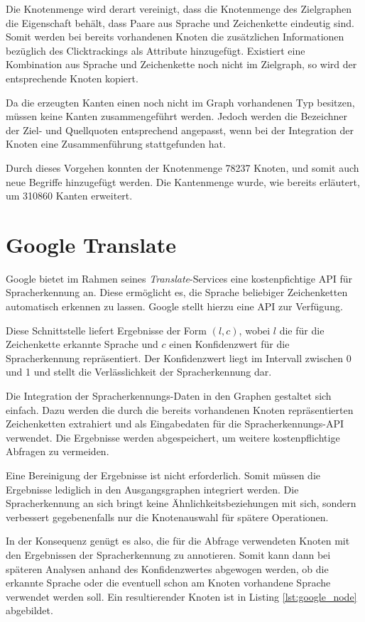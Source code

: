 Die Knotenmenge wird derart vereinigt, dass die Knotenmenge des Zielgraphen die Eigenschaft behält, dass Paare aus Sprache und Zeichenkette eindeutig sind. Somit werden bei bereits vorhandenen Knoten die zusätzlichen Informationen bezüglich des Clicktrackings als Attribute hinzugefügt. Existiert eine Kombination aus Sprache und Zeichenkette noch nicht im Zielgraph, so wird der entsprechende Knoten kopiert.

Da die erzeugten Kanten einen noch nicht im Graph vorhandenen Typ besitzen, müssen keine Kanten zusammengeführt werden. Jedoch werden die Bezeichner der Ziel- und Quellquoten entsprechend angepasst, wenn bei der Integration der Knoten eine Zusammenführung stattgefunden hat.

Durch dieses Vorgehen konnten der Knotenmenge \num{78237} Knoten, und somit auch neue Begriffe hinzugefügt werden. Die Kantenmenge wurde, wie bereits erläutert, um \num{310860} Kanten erweitert.

\section{Google Translate}

Google bietet im Rahmen seines \emph{Translate}-Services \cite{gt2013} eine kostenpfichtige API für Spracherkennung an. Diese ermöglicht es, die Sprache beliebiger Zeichenketten automatisch erkennen zu lassen. Google stellt hierzu eine API zur Verfügung.

Diese Schnittstelle liefert Ergebnisse der Form \((l, c)\), wobei \(l\) die für die Zeichenkette erkannte Sprache und \(c\) einen Konfidenzwert für die Spracherkennung repräsentiert. Der Konfidenzwert liegt im Intervall zwischen \num{0} und \num{1} und stellt die Verlässlichkeit der Spracherkennung dar.

Die Integration der Spracherkennungs-Daten in den Graphen gestaltet sich einfach. Dazu werden die durch die bereits vorhandenen Knoten repräsentierten Zeichenketten extrahiert und als Eingabedaten für die Spracherkennungs-API verwendet. Die Ergebnisse werden abgespeichert, um weitere kostenpflichtige Abfragen zu vermeiden.

Eine Bereinigung der Ergebnisse ist nicht erforderlich. Somit müssen die Ergebnisse lediglich in den Ausgangsgraphen integriert werden. Die Spracherkennung an sich bringt keine Ähnlichkeitsbeziehungen mit sich, sondern verbessert gegebenenfalls nur die Knotenauswahl für spätere Operationen.

In der Konsequenz genügt es also, die für die Abfrage verwendeten Knoten mit den Ergebnissen der Spracherkennung zu annotieren. Somit kann dann bei späteren Analysen anhand des Konfidenzwertes abgewogen werden, ob die erkannte Sprache oder die eventuell schon am Knoten vorhandene Sprache verwendet werden soll. Ein resultierender Knoten ist in Listing \ref{lst:google_node} abgebildet.

